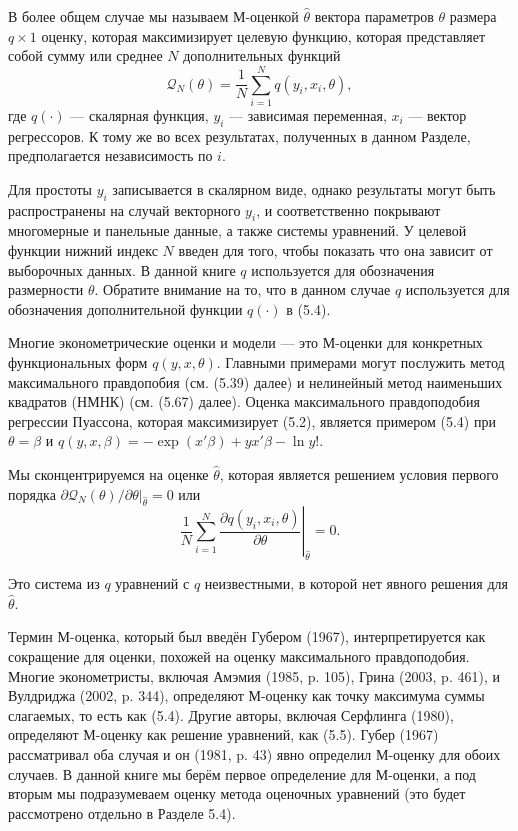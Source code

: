 В более общем случае мы называем М-оценкой $\hat{\theta}$ вектора параметров $\theta$ размера $q \times 1$ оценку, которая максимизирует целевую функцию, которая представляет собой сумму или среднее $N$ дополнительных функций
\begin{equation}
\mathcal{Q}_N(\theta)= \frac{1}{N} \sum_{i=1}^{N} q(y_i,x_i,\theta),
\end{equation}
где $q(\cdot)$ --- скалярная функция, $y_i$ --- зависимая переменная, $x_i$ --- вектор регрессоров. К тому же во всех результатах, полученных в данном Разделе, предполагается независимость по $i$.

Для простоты $y_i$ записывается в скалярном виде, однако результаты могут быть распространены на случай векторного $y_i$, и соответственно покрывают многомерные и панельные данные, а также системы уравнений. У целевой функции нижний индекс $N$ введен для того, чтобы показать что она зависит от выборочных данных. В данной книге $q$ используется для обозначения размерности $\theta$. Обратите внимание на то, что в данном случае $q$ используется для обозначения дополнительной функции $q(\cdot)$ в (5.4).

Многие эконометрические оценки и модели --- это М-оценки для конкретных функциональных форм $q(y,x,\theta)$. Главными примерами могут послужить метод максимального правдопобия (см. (5.39) далее) и нелинейный метод наименьших квадратов (НМНК) (см. (5.67) далее). Оценка максимального правдоподобия регрессии Пуассона, которая максимизирует (5.2), является примером (5.4) при $\theta=\beta$ и $q(y,x,\beta)=-\exp(x'\beta)+y x' \beta - \ln y!$.

Мы сконцентрируемся на оценке $\hat{\theta}$, которая является решением условия первого порядка  
$ \partial \mathcal{Q}_N(\theta) / \partial \theta |_{\hat{\theta}} = 0$ или
\begin{equation}
\left. \frac{1}{N} \sum_{i=1}^{N} \frac{\partial q(y_i,x_i,\theta)}{\partial \theta} \right|_{\hat{\theta}}=0.
\end{equation}

Это система из $q$ уравнений с $q$ неизвестными, в которой нет явного решения для $\hat{\theta}$.

Термин М-оценка, который был введён Губером (1967), интерпретируется как сокращение для оценки, похожей на оценку максимального правдоподобия. Многие эконометристы, включая Амэмия (1985, p. 105), Грина (2003, p. 461), и Вулдриджа (2002, p. 344), определяют М-оценку как точку максимума суммы слагаемых, то есть как (5.4). Другие авторы, включая Серфлинга (1980), определяют М-оценку как решение уравнений, как (5.5). Губер (1967) рассматривал оба случая и он (1981, p. 43) явно определил М-оценку для обоих случаев. В данной книге мы берём первое определение для М-оценки, а под вторым мы подразумеваем оценку метода оценочных уравнений (это будет рассмотрено отдельно в Разделе 5.4).

